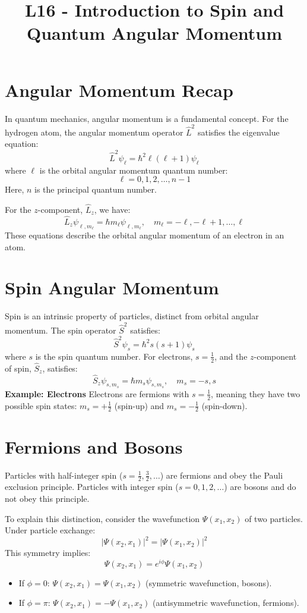 \documentclass[a4paper,12pt]{article}
\begin{document}
\title{\textbf{L16 - Introduction to Spin and Quantum Angular Momentum}}
\author{}
\date{}
\maketitle
\begin{multicols}{2}

\section*{Angular Momentum Recap}
In quantum mechanics, angular momentum is a fundamental concept. For the hydrogen atom, the angular momentum operator $\hat{L}^2$ satisfies the eigenvalue equation:
\[
\hat{L}^2 \psi_\ell = \hbar^2 \ell (\ell + 1) \psi_\ell
\]
where $\ell$ is the orbital angular momentum quantum number:
\[
\ell = 0, 1, 2, \dots, n-1
\]
Here, $n$ is the principal quantum number.

For the $z$-component, $\hat{L}_z$, we have:
\[
\hat{L}_z \psi_{\ell, m_\ell} = \hbar m_\ell \psi_{\ell, m_\ell}, \quad m_\ell = -\ell, -\ell+1, \dots, \ell
\]
These equations describe the orbital angular momentum of an electron in an atom.

\section*{Spin Angular Momentum}
Spin is an intrinsic property of particles, distinct from orbital angular momentum. The spin operator $\hat{S}^2$ satisfies:
\[
\hat{S}^2 \psi_s = \hbar^2 s (s+1) \psi_s
\]
where $s$ is the spin quantum number. For electrons, $s = \frac{1}{2}$, and the $z$-component of spin, $\hat{S}_z$, satisfies:
\[
\hat{S}_z \psi_{s, m_s} = \hbar m_s \psi_{s, m_s}, \quad m_s = -s, s
\]
\textbf{Example: Electrons}  
Electrons are fermions with $s = \frac{1}{2}$, meaning they have two possible spin states: $m_s = +\frac{1}{2}$ (spin-up) and $m_s = -\frac{1}{2}$ (spin-down).

\section*{Fermions and Bosons}
Particles with half-integer spin ($s = \frac{1}{2}, \frac{3}{2}, \dots$) are fermions and obey the Pauli exclusion principle.  
Particles with integer spin ($s = 0, 1, 2, \dots$) are bosons and do not obey this principle.

To explain this distinction, consider the wavefunction $\Psi(x_1, x_2)$ of two particles. Under particle exchange:
\[
|\Psi(x_2, x_1)|^2 = |\Psi(x_1, x_2)|^2
\]
This symmetry implies:
\[
\Psi(x_2, x_1) = e^{i\phi} \Psi(x_1, x_2)
\]
\begin{itemize}
    \item If $\phi = 0$: $\Psi(x_2, x_1) = \Psi(x_1, x_2)$ (symmetric wavefunction, bosons).
    \item If $\phi = \pi$: $\Psi(x_2, x_1) = -\Psi(x_1, x_2)$ (antisymmetric wavefunction, fermions).
\end{itemize}


\end{multicols}
\end{document}
